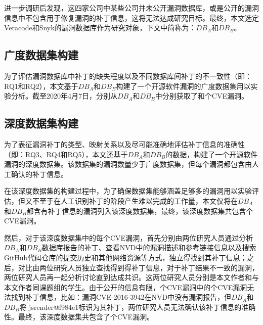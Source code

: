 进一步调研后发现，这四家公司中某些公司并未公开漏洞数据库，或是公开的漏洞信息中不包含用于修复漏洞的补丁信息，这将无法达成研究目标。最终，本文选定Veracode和Snyk的漏洞数据库作为研究对象，下文中简称为：$DB_A$和$DB_B$。


\subsection{广度数据集构建}
为了评估漏洞数据库中补丁的缺失程度以及不同数据库间补丁的不一致性（即：RQ1和RQ2），本文基于$DB_A$和$DB_B$构建了一个开源软件漏洞的广度数据集用以实验分析。截至2020年4月7日，分别从$DB_A$和$DB_B$中分别获取了和个CVE漏洞。

\subsection{深度数据集构建}
为了表征漏洞补丁的类型、映射关系以及尽可能准确地评估补丁信息的准确性（即：RQ3、RQ4和RQ5），本文还基于$DB_A$和$DB_B$的数据，构建了一个开源软件漏洞的深度数据集。该数据集的漏洞数量少于广度数据集，但每个漏洞都包含由人工确认的补丁信息。%

在该深度数据集的构建过程中，为了确保数据集能够涵盖足够多的漏洞用以实验评估，但又不至于在人工识别补丁的阶段产生难以完成的工作量，本文仅将在$DB_A$和$DB_B$都含有补丁信息的漏洞列入该深度数据集，最终，该深度数据集共包含个CVE漏洞。



然后，对于该深度数据集中的每个CVE漏洞，首先分别由两位研究人员通过分析$DB_A$和$DB_B$数据库报告的补丁、查看NVD中的漏洞描述和参考链接信息以及搜索GitHub代码仓库的提交历史和其他网络资源等方式，独立得找到其补丁信息；之后，对比由两位研究人员独立查找得到得补丁信息，对于补丁结果不一致的漏洞，两位研究人员再一起分析讨论直到达成共识。这两位研究人员分别是本文作者和与本文作者同课题组的学生。由于公开的信息有限，个CVE漏洞中的个CVE漏洞无法找到补丁信息，比如：漏洞CVE-2016-3942在NVD中没有漏洞报告，但$DB_A$和$DB_B$将 jsrender@f984e1\cite{jsrender}标识为其补丁，两位研究人员无法确认该补丁信息的准确性。最终，该深度数据集共包含了个CVE漏洞。

